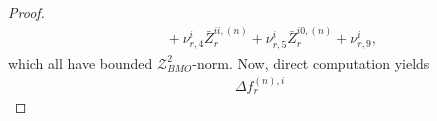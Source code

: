 \documentclass[10pt,a4paper]{article}
\theoremstyle{plain}
\theoremstyle{definition}
\numberwithin{equation}{section}
\begin{document}
\begin{proof}
\begin{align}
&\ \ \ \ + \nu_{r,4}^{i}\bar{Z}_{r}^{ii,(n)} + \nu_{r,5}^{i}\bar{Z}_{r}^{i0,(n)} + \nu_{r,9}^{i}, \nonumber
\end{align}
which all have bounded $\mathcal{Z}_{BMO}^{2}$-norm.
Now, direct computation yields
\begin{align}
\Delta f_{r}^{(n),i} 

\end{align}
\end{proof}
\end{document}
